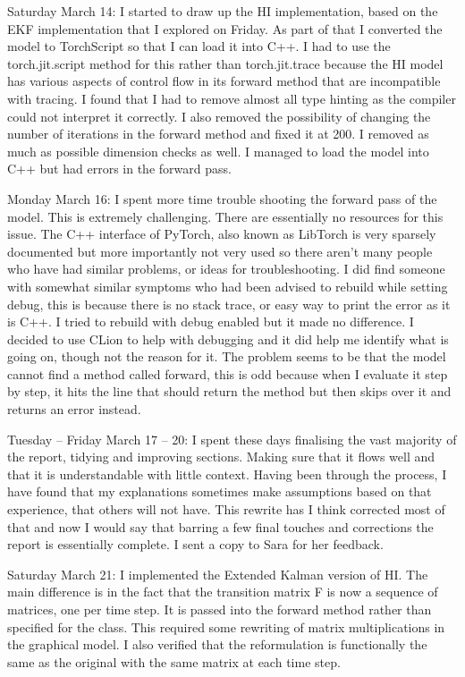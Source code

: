 \documentclass[]{../resources/final_report}
\begin{document}
\begin{appendices}
  Saturday March 14: I started to draw up the HI implementation, based on the EKF implementation that I explored on Friday. As part of that I converted the model to TorchScript so that I can load it into C++. I had to use the torch.jit.script method for this rather than torch.jit.trace because the HI model has various aspects of control flow in its forward method that are incompatible with tracing. I found that I had to remove almost all type hinting as the compiler could not interpret it correctly. I also removed the possibility of changing the number of iterations in the forward method and fixed it at 200. I removed as much as possible dimension checks as well. I managed to load the model into C++ but had errors in the forward pass.

  Monday March 16: I spent more time trouble shooting the forward pass of the model. This is extremely challenging. There are essentially no resources for this issue. The C++ interface of PyTorch, also known as LibTorch is very sparsely documented but more importantly not very used so there aren’t many people who have had similar problems, or ideas for troubleshooting. I did find someone with somewhat similar symptoms who had been advised to rebuild while setting debug, this is because there is no stack trace, or easy way to print the error as it is C++. I tried to rebuild with debug enabled but it made no difference. I decided to use CLion to help with debugging and it did help me identify what is going on, though not the reason for it. The problem seems to be that the model cannot find a method called forward, this is odd because when I evaluate it step by step, it hits the line that should return the method but then skips over it and returns an error instead.

  Tuesday – Friday March 17 – 20: I spent these days finalising the vast majority of the report, tidying and improving sections. Making sure that it flows well and that it is understandable with little context. Having been through the process, I have found that my explanations sometimes make assumptions based on that experience, that others will not have. This rewrite has I think corrected most of that and now I would say that barring a few final touches and corrections the report is essentially complete. I sent a copy to Sara for her feedback.

  Saturday March 21: I implemented the Extended Kalman version of HI. The main difference is in the fact that the transition matrix F is now a sequence of matrices, one per time step. It is passed into the forward method rather than specified for the class. This required some rewriting of matrix multiplications in the graphical model. I also verified that the reformulation is functionally the same as the original with the same matrix at each time step.


\end{appendices}
\end{document}
